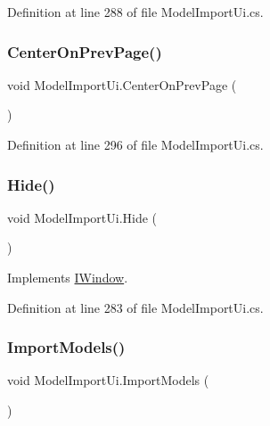 Definition at line 288 of file Model\+Import\+Ui.\+cs.

\mbox{\label{class_model_import_ui_aca3d68848d4f475e18e38b00913d1b7a}} 
\subsubsection{\texorpdfstring{CenterOnPrevPage()}{CenterOnPrevPage()}}
{\footnotesize\ttfamily void Model\+Import\+Ui.\+Center\+On\+Prev\+Page (\begin{DoxyParamCaption}{ }\end{DoxyParamCaption})}



Definition at line 296 of file Model\+Import\+Ui.\+cs.

\mbox{\label{class_model_import_ui_ad4cdb69e11afb1cc7cd6ec723bfde8a0}} 
\subsubsection{\texorpdfstring{Hide()}{Hide()}}
{\footnotesize\ttfamily void Model\+Import\+Ui.\+Hide (\begin{DoxyParamCaption}{ }\end{DoxyParamCaption})}



Implements \mbox{\hyperlink{interface_i_window_a829d3aa9bcf80a75ba84968399492378}{I\+Window}}.



Definition at line 283 of file Model\+Import\+Ui.\+cs.

\mbox{\label{class_model_import_ui_a3f6af56cdb9c346acfc58d9c00c4e6b0}} 
\subsubsection{\texorpdfstring{ImportModels()}{ImportModels()}}
{\footnotesize\ttfamily void Model\+Import\+Ui.\+Import\+Models (\begin{DoxyParamCaption}{ }\end{DoxyParamCaption})}




